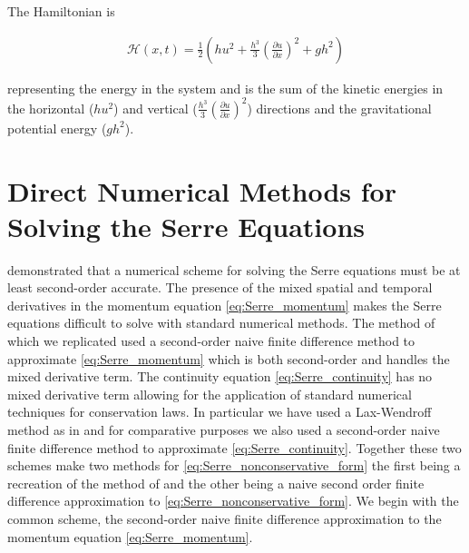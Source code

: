 \documentclass[SingleSpace,12pt,Journal]{Serre_ASCE}
\begin{document}
The Hamiltonian is
\begin{linenomath*}
\begin{gather}
\label{eqn:Hamildef}
\mathcal{H}(x,t) = \frac{1}{2} \left(hu^2 + \frac{h^3}{3} \left(\frac{\partial u}{\partial x}\right)^2 + gh^2\right)
\end{gather}
\end{linenomath*}
representing the energy in the system and is the sum of the kinetic energies in the horizontal ($hu^2$) and vertical ($\frac{h^3}{3} \left(\frac{\partial u}{\partial x}\right)^2$) directions and the gravitational potential energy ($gh^2$).   

\section{Direct Numerical Methods for Solving the Serre Equations} 
\label{sec:DirNumMet}
 demonstrated that a numerical scheme for solving the Serre equations must be at least second-order accurate. The presence of the mixed spatial and temporal derivatives in the momentum equation \eqref{eq:Serre_momentum} makes the Serre equations difficult to solve with standard numerical methods. The method of  which we replicated used a second-order naive finite difference method to approximate \eqref{eq:Serre_momentum} which is both second-order and handles the mixed derivative term. The continuity equation \eqref{eq:Serre_continuity} has no mixed derivative term allowing for the application of standard numerical techniques for conservation laws. In particular we have used a Lax-Wendroff method as in  and for comparative purposes we also used a second-order naive finite difference method to approximate \eqref{eq:Serre_continuity}. Together these two schemes make two methods for \eqref{eq:Serre_nonconservative_form} the first being a recreation of the method of  and the other being a naive second order finite difference approximation to \eqref{eq:Serre_nonconservative_form}. We begin with the common scheme, the second-order naive finite difference approximation to the momentum equation \eqref{eq:Serre_momentum}.
\end{document}
